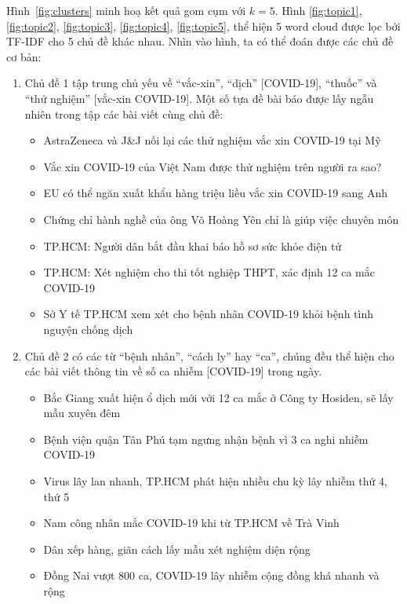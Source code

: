 Hình~\ref{fig:clusters} minh hoạ kết quả gom cụm với $k=5$. Hình
\ref{fig:topic1}, \ref{fig:topic2}, \ref{fig:topic3}, \ref{fig:topic4},
\ref{fig:topic5}, thể hiện 5 word cloud được lọc bởi TF-IDF cho 5 chủ đề khác
nhau. Nhìn vào hình, ta có thể đoán được các chủ đề cơ bản:
\begin{enumerate}
    \item Chủ đề 1 tập trung chủ yếu về ``vắc-xin'', ``dịch'' [COVID-19], ``thuốc''
        và ``thử nghiệm'' [vắc-xin COVID-19]. Một số tựa đề bài báo được lấy ngẫu
        nhiên trong tập các bài viết cùng chủ đề:
        \begin{itemize}
            \item AstraZeneca và J\&J nối lại các thử nghiệm vắc xin COVID-19 tại Mỹ
            \item Vắc xin COVID-19 của Việt Nam được thử nghiệm trên người ra sao?
            \item EU có thể ngăn xuất khẩu hàng triệu liều vắc xin COVID-19 sang Anh
            \item Chứng chỉ hành nghề của ông Võ Hoàng Yên chỉ là giúp việc chuyên môn
            \item TP.HCM: Người dân bắt đầu khai báo hồ sơ sức khỏe điện tử
            \item TP.HCM: Xét nghiệm cho thi tốt nghiệp THPT, xác định 12 ca mắc COVID-19
            \item Sở Y tế TP.HCM xem xét cho bệnh nhân COVID-19 khỏi bệnh tình nguyện chống dịch
        \end{itemize}
    \item Chủ đề 2 có các từ ``bệnh nhân'', ``cách ly'' hay ``ca'', chúng đều thể
        hiện cho các bài viết thông tin về số ca nhiễm [COVID-19] trong ngày.
        \begin{itemize}
            \item Bắc Giang xuất hiện ổ dịch mới với 12 ca mắc ở Công ty Hosiden, sẽ lấy mẫu xuyên đêm
            \item Bệnh viện quận Tân Phú tạm ngưng nhận bệnh vì 3 ca nghi nhiễm COVID-19
            \item Virus lây lan nhanh, TP.HCM phát hiện nhiều chu kỳ lây nhiễm thứ 4, thứ 5
            \item Nam công nhân mắc COVID-19 khi từ TP.HCM về Trà Vinh
            \item Dân xếp hàng, giãn cách lấy mẫu xét nghiệm diện rộng
            \item Đồng Nai vượt 800 ca, COVID-19 lây nhiễm cộng đồng khá nhanh và rộng

\end{itemize}
\end{enumerate}
